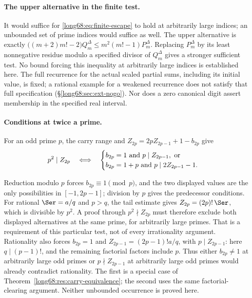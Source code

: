 \paragraph{The upper alternative in the finite test.}
It would suffice for \eqref{long68:eq:finite-escape} to hold at arbitrarily
large indices; an unbounded set of prime indices would suffice as well.  The upper alternative is exactly
$\bigl((m+2)m!-2\bigr)Q^\Delta_m\le m^2(m!-1)P^\Delta_m$.  Replacing $P^\Delta_m$ by its least
nonnegative residue modulo a specified divisor of $Q^\Delta_m$ gives a stronger
sufficient test. No bound forcing this inequality at arbitrarily large
indices is established here. The full recurrence for the actual scaled
partial sums, including its initial value, is fixed; a rational example
for a weakened recurrence does not satisfy that full specification
(\S\ref{long68:sec:ext-nogo}). Nor does a zero canonical digit assert
membership in the specified real interval.

\paragraph{Conditions at twice a prime.}
For an odd prime $p$, the carry range and $Z_{2p}=2pZ_{2p-1}+1-b_{2p}$ give
\begin{equation}\label{long68:eq:doubled-prime}
 p^2\mid Z_{2p}
 \quad\Longleftrightarrow\quad
 \begin{cases}
 b_{2p}=1\ \hbox{and}\ p\mid Z_{2p-1},\ \hbox{or}\\
 b_{2p}=1+p\ \hbox{and}\ p\mid2Z_{2p-1}-1 .
 \end{cases}
\end{equation}


Reduction modulo $p$ forces $b_{2p}\equiv1\pmod p$, and the two displayed
values are the only possibilities in $[-1,2p-1]$; division by $p$ gives the
predecessor conditions.  For rational $\Ser=a/q$ and $p>q$, the tail estimate gives
$Z_{2p}=(2p)!\,\Ser$, which is divisible by $p^2$. A proof through
$p^2\nmid Z_{2p}$ must therefore exclude both displayed alternatives at
the same prime, for arbitrarily large primes.
That is a requirement of this particular test, not of every irrationality
argument. Rationality also forces $b_{2p}=1$ and
$Z_{2p-1}=(2p-1)!a/q$, with $p\mid Z_{2p-1}$: here $q\mid(p-1)!$,
and the remaining factorial factors include $p$. Thus either
$b_{2p}\ne1$ at arbitrarily large odd primes or
$p\nmid Z_{2p-1}$ at arbitrarily large odd primes would already contradict
rationality. The first is a special case of
Theorem~\ref{long68:res:carry-equivalence}; the second uses the same
factorial-clearing argument. Neither unbounded occurrence is proved here.

